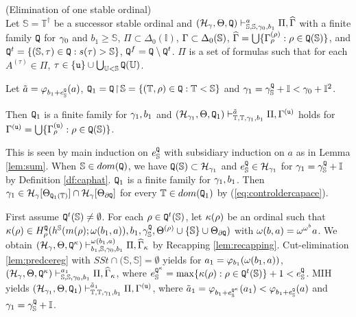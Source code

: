 \documentclass{article}
\newcommand{\mS}{\mathbb{S}}
\newcommand{\mI}{\mathbb{I}}
\newcommand{\mT}{\mathbb{T}}
\newcommand{\mU}{\mathbb{U}}
\begin{document}
\blem\label{lem:main.2}{\rm (Elimination of one stable ordinal)}\\
Let $\mS=\mT^{\dagger}$ be a successor stable ordinal and
$
(\mathcal{H}_{\gamma},\Theta,{\tt Q})
\vdash^{a}_{\mS,\mS,\gam_{0},b_{1}}
\Pi,\widehat{\Gam}
$ with a finite family ${\tt Q}$ for $\gamma_{0}$ and
$b_{1}\geq\mS$, $\Pi\subset\Delta_{0}(\mathbb{I})$,
$\Gam\subset\Del_{0}(\mS)$,
$\widehat{\Gam}=\bigcup\{\Gam_{\rho}^{(\rho)}: \rho\in{\tt Q}(\mS)\}$,
and 
${\tt Q}^{t}=\{(\mS,\tau)\in{\tt Q}: s(\tau)>\mS\}$,
${\tt Q}^{f}={\tt Q}\setminus{\tt Q}^{t}$.
$\Pi$ is a set of formulas such that 
for each $A^{(\tau)}\in\Pi$, 
$\tau\in\{{\tt u}\}\cup\bigcup_{\mU<\mS}{\tt Q}(\mU)$.

Let $\tilde{a}=\vphi_{b_{1}+e^{{\tt Q}}_{\mS}}(a)$,
${\tt Q}_{1}={\tt Q}\restrict\mS=\{(\mT,\rho)\in{\tt Q}: \mT<\mS\}$ and
$\gam_{1}=\gam_{\mS}^{{\tt Q}}+\mI<\gam_{0}+\mI^{2}$.



Then 
${\tt Q}_{1}$ is a finite family for $\gamma_{1},b_{1}$ and
$
(\mathcal{H}_{\gam_{1}},\Theta, {\tt Q}_{1}
)
\vdash^{\tilde{a}}_{\mT,\mT,\gam_{1},b_{1}}
\Pi,\Gam^{({\tt u})}
$
holds for 
$\Gam^{({\tt u})}=\bigcup\{\Gam_{\rho}^{({\tt u})}: \rho\in{\tt Q}(\mS)\}$.





\elem
\bprf
This is seen
by main induction on $e^{{\tt Q}}_{\mS}$ with subsidiary induction on $a$ as in Lemma \ref{lem:sum}.
When $\mS\in dom({\tt Q})$, we have ${\tt Q}(\mS)\subset\calh_{\gam_{1}}$ and
$e^{{\tt Q}}_{\mS}\in\calh_{\gam_{1}}$ for $\gam_{1}=\gam_{\mS}^{{\tt Q}}+\mI$
by Definition \ref{df:caphat}.
${\tt Q}_{1}$ is a finite family for $\gamma_{1}, b_{1}$.
Then $\gam_{1}\in\calh_{\gam}[\Tht_{{\tt Q}_{1}(\mT)}]\cap\calh_{\gam}[\Tht_{\partial{\tt Q}}]$ for every $\mT\in dom({\tt Q}_{1})$
by (\ref{eq:controldercapace}).



First assume ${\tt Q}^{t}(\mS)\neq\emptyset$.
For each $\rho\in{\tt Q}^{t}(\mS)$, let
 $\kappa(\rho)$ be an ordinal such that
$\kappa(\rho)\in H^{{\tt Q}}_{\rho}(h^{\mS}(m(\rho);\ome(b_{1},a)),b_{1}, \gamma_{\mS}^{{\tt Q}},\Theta^{(\rho)}
\cup\{\mS\}\cup\Tht_{\partial{\tt Q}})$
 with $\omega(b,a)=\omega^{\omega^{b}}a$.
We obtain $(\calh_{\gam},\Tht,{\tt Q}^{\kap})\vdash^{\ome(b_{1},a)}_{b_{1},\mS,\gam_{0},b_{1}}\Pi,\widehat{\Gam}_{\kap}$
by Recapping \ref{lem:recapping}.
Cut-elimination \ref{lem:predcereg} with $SSt\cap(\mS,\mS]=\emptyset$
yields for $a_{1}=\varphi_{b_{1}}(\omega(b_{1},a))$,
 $(\calh_{\gam},\Tht,{\tt Q}^{\kap})\vdash^{a_{1}}_{\mS,\mS,\gam_{0},b_{1}}\Pi,\widehat{\Gam}_{\kap}$,
where 
$e^{{\tt Q}^{\kap}}_{\mS}=\max\{\kap(\rho):\rho\in{\tt Q}^{t}(\mS)\}+1<e^{{\tt Q}}_{\mS}$.
MIH yields
 $(\calh_{\gam_{1}},\Tht,{\tt Q}_{1})\vdash^{\tilde{a}_{1}}_{\mT,\mT,\gam_{1},b_{1}}\Pi,\Gam^{({\tt u})}$, where
$\tilde{a}_{1}=\vphi_{b_{1}+e^{{\tt Q}^{\kap}}_{\mS}}(a_{1})<
\vphi_{b_{1}+e^{{\tt Q}}_{\mS}}(a)$ and $\gam_{1}=\gam_{\mS}^{{\tt Q}}+\mI$.
 
\end{document}
